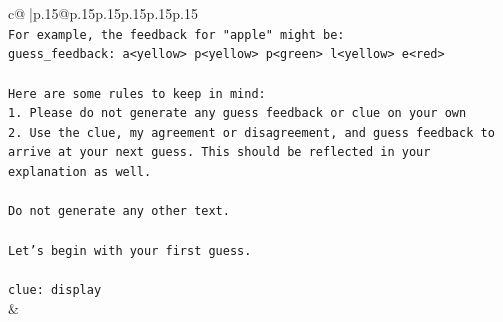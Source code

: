 \documentclass{article}
\begin{document}
{\begin{supertabular}{c@{$\;$}|p{.15\linewidth}@{}p{.15\linewidth}p{.15\linewidth}p{.15\linewidth}p{.15\linewidth}p{.15\linewidth}}
{{{\\ 
\texttt{For example, the feedback for "apple" might be:} \\
\texttt{guess\_feedback: a<yellow> p<yellow> p<green> l<yellow> e<red>} \\
\\ 
\texttt{Here are some rules to keep in mind:} \\
\texttt{1. Please do not generate any guess feedback or clue on your own} \\
\texttt{2. Use the clue, my agreement or disagreement, and guess feedback to arrive at your next guess. This should be reflected in your explanation as well.} \\
\\ 
\texttt{Do not generate any other text.} \\
\\ 
\texttt{Let's begin with your first guess.} \\
\\ 
\texttt{clue: display} \\
            }
        }
    }
    & \\ \\


\end{supertabular}}
\end{document}
